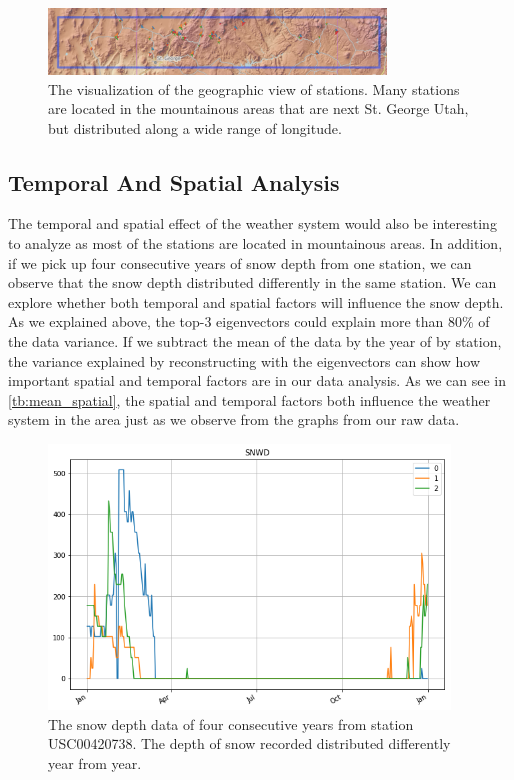 \documentclass[a4paper]{article}
\begin{document}
\begin{figure}[!htp]
\centering
\includegraphics[width=0.8\textwidth]{geo_station.png}
\caption{\label{fig:geo_station} The visualization of the geographic view of stations. Many stations are located in the mountainous areas that are next St. George Utah, but distributed along a wide range of longitude.}
\end{figure}

\subsection{Temporal And Spatial Analysis}
The temporal and spatial effect of the weather system would also be interesting to analyze as most of the stations are located in mountainous areas. In addition, if we pick up four consecutive years of snow depth from one station, we can observe that the snow depth distributed differently in the same station. We can explore whether both temporal and spatial factors will influence the snow depth. As we explained above, the top-3 eigenvectors could explain more than 80\% of the data variance. If we subtract the mean of the data by the year of by station, the variance explained by reconstructing with the eigenvectors can show how important spatial and temporal factors are in our data analysis. As we can see in \ref{tb:mean_spatial}, the spatial and temporal factors both influence the weather system in the area just as we observe from the graphs from our raw data.



\begin{figure}[!htp]
\centering
\includegraphics[width=0.95\textwidth]{snow_year.png}
\caption{\label{fig:snow_year} The snow depth data of four consecutive years from station USC00420738. The depth of snow recorded distributed differently year from year.}
\end{figure}
\end{document}
